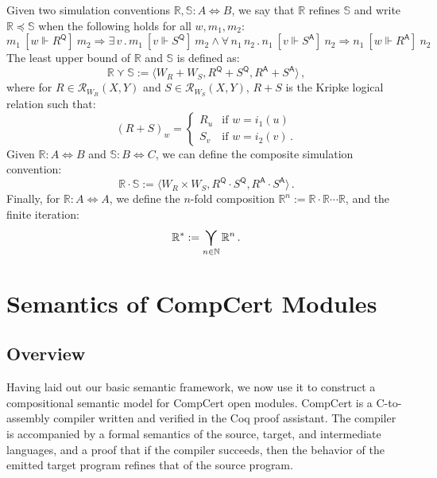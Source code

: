 \documentclass[acmsmall,timestamp,review,anonymous]{acmart}
\newcommand{\kw}[1]{\ensuremath{ \mathsf{#1} }}
\newcommand{\ifr}[1]{\ [{#1}]\ }
\begin{document}
\begin{definition} %
Given two simulation conventions $\mathbb{R}, \mathbb{S} : A \Leftrightarrow B$,
we say that
$\mathbb{R}$ refines $\mathbb{S}$ and write
$\mathbb{R} \preceq \mathbb{S}$
when the following holds for all $w, m_1, m_2$:
\[
      m_1 \ifr{w \Vdash R^\kw{Q}} m_2 \Rightarrow
      \exists \, v \,.\,
        m_1 \ifr{v \Vdash S^\kw{Q}} m_2 \wedge
        \forall \, n_1 \, n_2 \,.\,
          n_1 \ifr{v \Vdash S^\kw{A}} n_2 \Rightarrow
          n_1 \ifr{w \Vdash R^\kw{A}} n_2
\]
The least upper bound of $\mathbb{R}$ and $\mathbb{S}$
is defined as:
\[
    \mathbb{R} \curlyvee \mathbb{S} :=
      \langle
        W_R + W_S,
        R^\kw{Q} + S^\kw{Q},
        R^\kw{A} + S^\kw{A}
      \rangle \,,
\]
where for $R \in \mathcal{R}_{W_R}(X,Y)$
and $S \in \mathcal{R}_{W_S}(X,Y)$,
$R + S$ is the Kripke logical relation such that:
\[
    (R + S)_w =
    \begin{cases}
      R_u & \mbox{if } w = i_1(u) \\
      S_v & \mbox{if } w = i_2(v) \,.
    \end{cases}
\]
Given
$\mathbb{R} : A \Leftrightarrow B$ and
$\mathbb{S} : B \Leftrightarrow C$,
we can define the composite simulation convention:
\[
    \mathbb{R} \cdot \mathbb{S} :=
      \langle
        W_R \times W_S,
        R^\kw{Q} \cdot S^\kw{Q},
        R^\kw{A} \cdot S^\kw{A}
      \rangle \,.
\]
Finally,
for $\mathbb{R} : A \Leftrightarrow A$,
we define the $n$-fold composition
$\mathbb{R}^n := \mathbb{R} \cdot \mathbb{R} \cdots \mathbb{R}$,
and the finite iteration:
\[
    \mathbb{R}^* :=
      \bigcurlyvee_{n \in \mathbb{N}} \mathbb{R}^n \,.
\]
\end{definition}



\section{Semantics of CompCert Modules} \label{sec:modsem} %

\subsection{Overview} %

Having laid out our basic semantic framework,
we now use it to construct a compositional semantic model
for CompCert open modules.
CompCert is a C-to-assembly compiler written and verified
in the Coq proof assistant.
The compiler is accompanied by
a formal semantics of the source, target, and intermediate languages,
and a proof that if the compiler succeeds,
then the behavior of the emitted target program
refines that of the source program.
\end{document}
